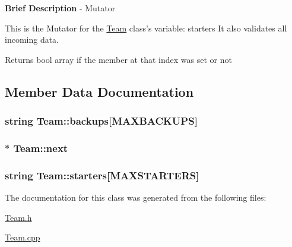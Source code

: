 {\bfseries Brief Description} -\/ Mutator 

This is the Mutator for the \hyperlink{class_team}{Team} class's variable\-: starters It also validates all incoming data.

\begin{DoxyReturn}{Returns}
bool array if the member at that index was set or not 
\end{DoxyReturn}


\subsection{Member Data Documentation}
\hypertarget{class_team_ad1ef40efc4c39fe0cc34784b872054f7}{
\subsubsection[{backups}]{\setlength{\rightskip}{0pt plus 5cm}string Team\-::backups\mbox{[}{\bf M\-A\-X\-B\-A\-C\-K\-U\-P\-S}\mbox{]}\hspace{0.3cm}{\ttfamily [private]}}}\label{class_team_ad1ef40efc4c39fe0cc34784b872054f7}
\hypertarget{class_team_a1d82260b41ee7610a0e36210825a53ea}{
\subsubsection[{next}]{$\ast$ Team\-::next}}\label{class_team_a1d82260b41ee7610a0e36210825a53ea}
\hypertarget{class_team_ac3a41d0b7f4013c8643529062bf2c239}{
\subsubsection[{starters}]{\setlength{\rightskip}{0pt plus 5cm}string Team\-::starters\mbox{[}{\bf M\-A\-X\-S\-T\-A\-R\-T\-E\-R\-S}\mbox{]}\hspace{0.3cm}{\ttfamily [private]}}}\label{class_team_ac3a41d0b7f4013c8643529062bf2c239}


The documentation for this class was generated from the following files\-:\begin{DoxyCompactItemize}
\item 
\hyperlink{_team_8h}{Team.\-h}\item 
\hyperlink{_team_8cpp}{Team.\-cpp}\end{DoxyCompactItemize}
